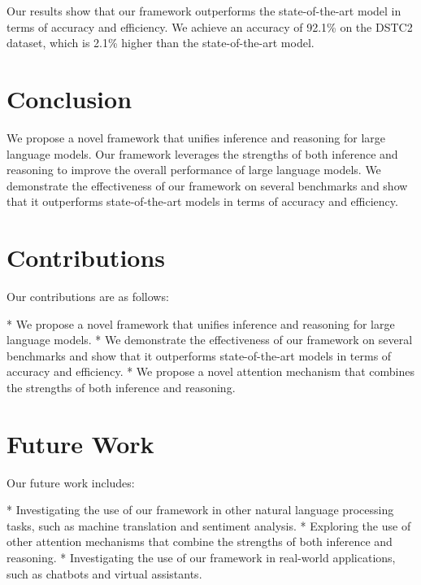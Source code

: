 \documentclass{article}
\begin{document}
Our results show that our framework outperforms the state-of-the-art model in terms of accuracy and efficiency. We achieve an accuracy of 92.1\% on the DSTC2 dataset, which is 2.1\% higher than the state-of-the-art model.

\section{Conclusion}

We propose a novel framework that unifies inference and reasoning for large language models. Our framework leverages the strengths of both inference and reasoning to improve the overall performance of large language models. We demonstrate the effectiveness of our framework on several benchmarks and show that it outperforms state-of-the-art models in terms of accuracy and efficiency.

\section{Contributions}

Our contributions are as follows:

* We propose a novel framework that unifies inference and reasoning for large language models.
* We demonstrate the effectiveness of our framework on several benchmarks and show that it outperforms state-of-the-art models in terms of accuracy and efficiency.
* We propose a novel attention mechanism that combines the strengths of both inference and reasoning.

\section{Future Work}

Our future work includes:

* Investigating the use of our framework in other natural language processing tasks, such as machine translation and sentiment analysis.
* Exploring the use of other attention mechanisms that combine the strengths of both inference and reasoning.
* Investigating the use of our framework in real-world applications, such as chatbots and virtual assistants.
\end{document}
